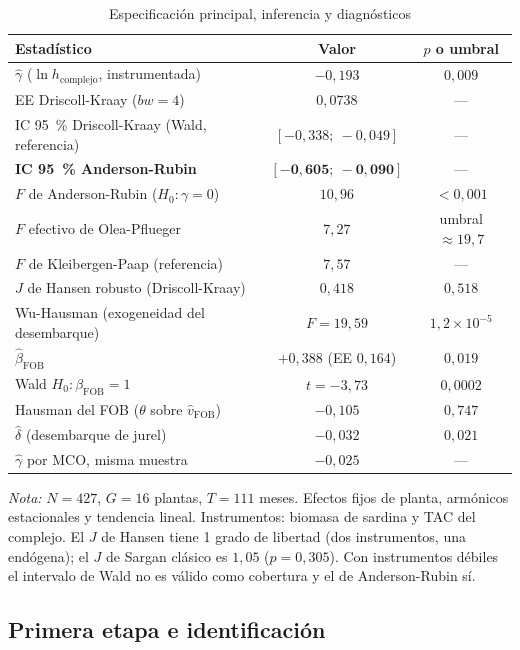 \documentclass[11pt]{article}
\newcommand{\note}[2]{%
  \par\vspace{0.5ex}
  \begin{minipage}{#1}\footnotesize\textit{Nota:} #2\end{minipage}%
}
\begin{document}
\begin{table}[htbp]
  \caption{Especificación principal, inferencia y diagnósticos}\label{tab:principal}
  \centering
  \small
  \begin{tabular}{@{} lcc @{}}
    \toprule
    Estadístico & Valor & $p$ o umbral \\
    \midrule
    $\hat\gamma$ ($\ln h_{\text{complejo}}$, instrumentada) & $-0{,}193$ & $0{,}009$ \\
    EE Driscoll-Kraay ($bw=4$) & $0{,}0738$ & --- \\
    IC 95~\% Driscoll-Kraay (Wald, referencia) & $[-0{,}338;\ -0{,}049]$ & --- \\
    \textbf{IC 95~\% Anderson-Rubin} & $\mathbf{[-0{,}605;\ -0{,}090]}$ & --- \\
    $F$ de Anderson-Rubin ($H_0:\gamma=0$) & $10{,}96$ & $<0{,}001$ \\
    $F$ efectivo de Olea-Pflueger & $7{,}27$ & umbral $\approx 19{,}7$ \\
    $F$ de Kleibergen-Paap (referencia) & $7{,}57$ & --- \\
    $J$ de Hansen robusto (Driscoll-Kraay) & $0{,}418$ & $0{,}518$ \\
    Wu-Hausman (exogeneidad del desembarque) & $F=19{,}59$ & $1{,}2\times10^{-5}$ \\
    $\hat\beta_{\text{FOB}}$ & $+0{,}388$ (EE $0{,}164$) & $0{,}019$ \\
    Wald $H_0:\beta_{\text{FOB}}=1$ & $t=-3{,}73$ & $0{,}0002$ \\
    Hausman del FOB ($\theta$ sobre $\hat v_{\text{FOB}}$) & $-0{,}105$ & $0{,}747$ \\
    $\hat\delta$ (desembarque de jurel) & $-0{,}032$ & $0{,}021$ \\
    $\hat\gamma$ por MCO, misma muestra & $-0{,}025$ & --- \\
    \bottomrule
  \end{tabular}
  \note{0.9\textwidth}{$N=427$, $G=16$ plantas, $T=111$ meses. Efectos fijos de planta, armónicos estacionales y tendencia lineal. Instrumentos: biomasa de sardina y TAC del complejo. El $J$ de Hansen tiene 1 grado de libertad (dos instrumentos, una endógena); el $J$ de Sargan clásico es $1{,}05$ ($p=0{,}305$). Con instrumentos débiles el intervalo de Wald no es válido como cobertura y el de Anderson-Rubin sí.}
\end{table}

\subsection{Primera etapa e identificación}\label{sec:interanual}
\end{document}
